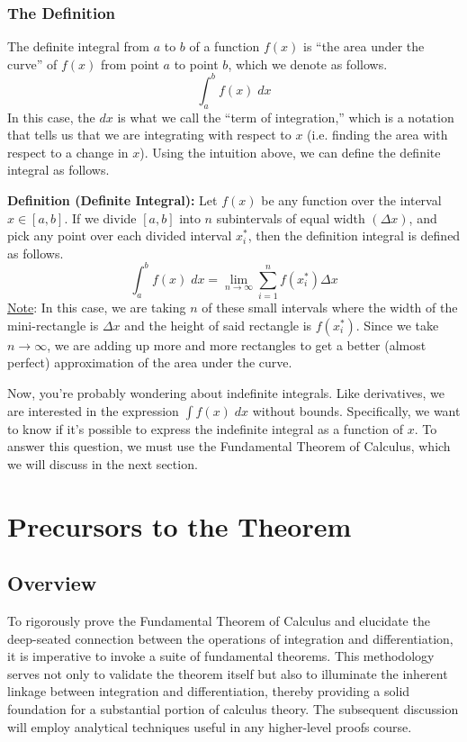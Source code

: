 \documentclass[8pt]{extarticle}
\begin{document}
\subsubsection{The Definition}
The definite integral from $a$ to $b$ of a function $f(x)$ is ``the area under the curve'' of $f(x)$ from point $a$ to point $b$, which we denote as follows.
$$
\int_a^b f(x) \;dx
$$
In this case, the $dx$ is what we call the ``term of integration,'' which is a notation that tells us that we are integrating with respect to $x$ (i.e. finding the area with respect to a change in $x$). Using the intuition above, we can define the definite integral as follows.
\begin{boxedsection}
  \textbf{Definition (Definite Integral):} Let $f(x)$ be any function over the interval $x \in [a,b]$. If we divide $[a,b]$ into $n$ subintervals of equal width $(\Delta x)$, and pick any point over each divided interval $x_i^*$, then the definition integral is defined as follows.
  $$
  \int_a^b f(x) \;dx = \lim_{n\rightarrow\infty} \sum_{i=1}^n f(x_i^*) \Delta x 
  $$
  \underline{Note}: In this case, we are taking $n$ of these small intervals where the width of the mini-rectangle is $\Delta x$ and the height of said rectangle is $f(x_i^*)$. Since we take $n \rightarrow \infty$, we are adding up more and more rectangles to get a better (almost perfect) approximation of the area under the curve.
\end{boxedsection}
Now, you're probably wondering about indefinite integrals. Like derivatives, we are interested in the expression $\int f(x)\;dx$ without bounds. Specifically, we want to know if it's possible to express the indefinite integral as a function of $x$. To answer this question, we must use the Fundamental Theorem of Calculus, which we will discuss in the next section.
\pagebreak
\section{Precursors to the Theorem}
\subsection{Overview}
To rigorously prove the Fundamental Theorem of Calculus and elucidate the deep-seated connection between the operations of integration and differentiation, it is imperative to invoke a suite of fundamental theorems. This methodology serves not only to validate the theorem itself but also to illuminate the inherent linkage between integration and differentiation, thereby providing a solid foundation for a substantial portion of calculus theory. The subsequent discussion will employ analytical techniques useful in any higher-level proofs course.
\end{document}
